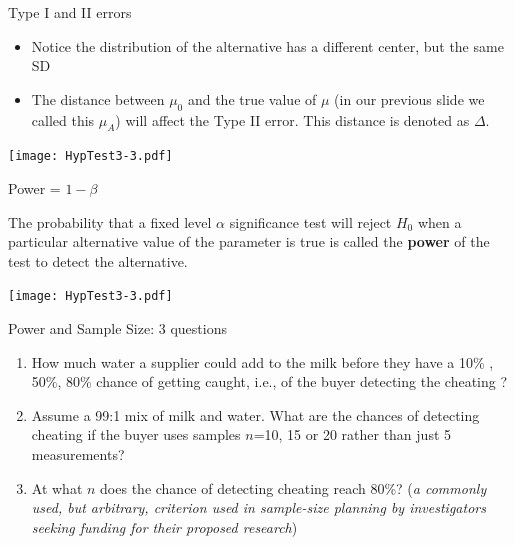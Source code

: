 \documentclass[10pt,handout]{beamer}\usepackage[]{graphicx}\usepackage[]{color}
\begin{document}
\begin{frame}[fragile]{Type I and II errors}
	\small
	\begin{itemize}
		\item Notice the distribution of the alternative has a different center, but the same SD  \pause 
		\item The distance between $\mu_0$ and the true value of $\mu$ (in our previous slide we called this $\mu_A$) will affect the Type II error. This distance is denoted as $\Delta$.
	\end{itemize}
	
	
	\centering
	\texttt{[image: HypTest3-3.pdf]}
	
	
	
\end{frame}


\begin{frame}[fragile]{Power = $1 - \beta$}
	
	\vspace*{-0.2in}
	
	\begin{definition}[Power = $1-\beta$]
		The probability that a fixed level $\alpha$ significance test will reject $H_0$ when a particular alternative value of the parameter is true is called the \textbf{power} of the test to detect the alternative. 
	\end{definition}
	
	
	\vspace*{-0.08in}
	
	\centering
	\texttt{[image: HypTest3-3.pdf]}
	
	
\end{frame}




\begin{frame}{Power and Sample Size: 3 questions}
	
	\begin{enumerate}
		\setlength\itemsep{1em}
		\item How much water a supplier could add to the milk before they have a 10\% , 50\%, 80\%
		chance of getting caught, i.e., of the buyer detecting the cheating ? \pause
		\item Assume a 99:1 mix of milk and water. What are the chances of detecting cheating if the buyer uses samples $n$=10, 15 or 20 rather than just 5 measurements? \pause
		\item At what $n$ does the chance of detecting cheating reach 80\%? (\textit{a commonly used, but arbitrary, criterion used in sample-size planning by investigators seeking funding for their proposed research})
	\end{enumerate}
	
\end{frame}
\end{document}
